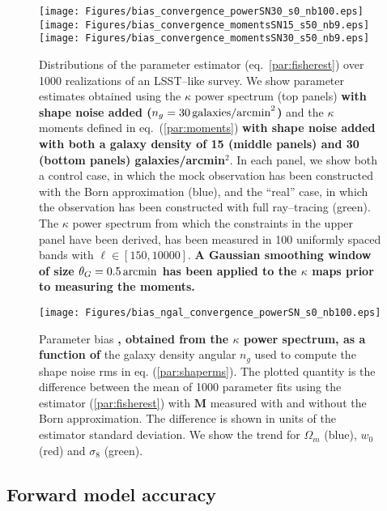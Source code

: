 \documentclass[reprint,aps,prd,superscriptaddress,showkeys,showpacs]{revtex4-1}
\newcommand{\bb}[1]{\mathbf{#1}}
\begin{document}
\begin{figure*}
\begin{center}
\texttt{[image: Figures/bias\_convergence\_powerSN30\_s0\_nb100.eps]}
\texttt{[image: Figures/bias\_convergence\_momentsSN15\_s50\_nb9.eps]}
\texttt{[image: Figures/bias\_convergence\_momentsSN30\_s50\_nb9.eps]}
\end{center}
\caption{Distributions of the parameter estimator (eq.~\ref{par:fisherest}) over 1000 realizations of an LSST--like survey. We show parameter estimates obtained using the $\kappa$ power spectrum (top panels) \textbf{\color{blue} with shape noise added ($n_g=30\,{\rm galaxies/arcmin}^2$)} and the $\kappa$ moments defined in eq.~(\ref{par:moments}) \textbf{\color{blue} with shape noise added with both a galaxy density of 15 (middle panels) and 30 (bottom panels) galaxies/arcmin$^2$}. In each panel, we show both a control case, in which the mock observation has been constructed with the Born approximation (blue), and the ``real'' case, in which the observation has been constructed with full ray--tracing (green). The $\kappa$ power spectrum from which the constraints in the upper panel have been derived, has been measured in 100 uniformly spaced bands with $\ell \in [150,10000]$. \textbf{\color{blue} A Gaussian smoothing window of size $\theta_G=0.5\,{\rm arcmin}$ has been applied to the $\kappa$ maps prior to measuring the moments.}}
\label{fig:parbias}
\end{figure*}

\begin{figure}
\begin{center}
\texttt{[image: Figures/bias\_ngal\_convergence\_powerSN\_s0\_nb100.eps]}
\end{center}
\caption{Parameter bias \textbf{\color{blue}, obtained from the $\kappa$ power spectrum, as a function of} the galaxy density angular $n_g$ used to compute the shape noise rms in eq. (\ref{par:shaperms}). The plotted quantity is the difference between the mean of 1000 parameter fits using the estimator (\ref{par:fisherest}) with $\bb{M}$ measured with and without the Born approximation. The difference is shown in units of the estimator standard deviation. We show the trend for $\Omega_m$ (blue), $w_0$ (red) and $\sigma_8$ (green).}
\label{fig:parbiasSN}
\end{figure}

\subsection{Forward model accuracy}
\end{document}

